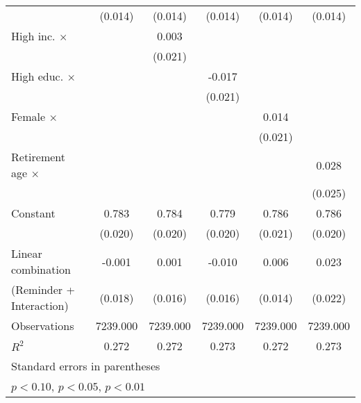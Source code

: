{\begin{tabular}{l*{5}{c}}
                    &     (0.014)         &     (0.014)         &     (0.014)         &     (0.014)         &     (0.014)         \\
\addlinespace
High inc. $\times$  &                     &       0.003         &                     &                     &                     \\
                    &                     &     (0.021)         &                     &                     &                     \\
\addlinespace
High educ. $\times$ &                     &                     &      -0.017         &                     &                     \\
                    &                     &                     &     (0.021)         &                     &                     \\
\addlinespace
Female $\times$     &                     &                     &                     &       0.014         &                     \\
                    &                     &                     &                     &     (0.021)         &                     \\
\addlinespace
Retirement age $\times$&                     &                     &                     &                     &       0.028         \\
                    &                     &                     &                     &                     &     (0.025)         \\
\addlinespace
Constant            &       0.783\sym{***}&       0.784\sym{***}&       0.779\sym{***}&       0.786\sym{***}&       0.786\sym{***}\\
                    &     (0.020)         &     (0.020)         &     (0.020)         &     (0.021)         &     (0.020)         \\
\midrule
Linear combination  &      -0.001         &       0.001         &      -0.010         &       0.006         &       0.023         \\
(Reminder + Interaction)&     (0.018)         &     (0.016)         &     (0.016)         &     (0.014)         &     (0.022)         \\
Observations        &    7239.000         &    7239.000         &    7239.000         &    7239.000         &    7239.000         \\
\(R^{2}\)           &       0.272         &       0.272         &       0.273         &       0.272         &       0.273         \\
\bottomrule
\multicolumn{6}{l}{\footnotesize Standard errors in parentheses}\\
\multicolumn{6}{l}{\footnotesize \sym{*} \(p<0.10\), \sym{**} \(p<0.05\), \sym{***} \(p<0.01\)}\\
\end{tabular}
}
